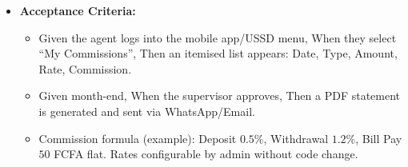 \documentclass[11pt]{article}
\begin{document}
\begin{exoresolu}
\begin{enumerate}
\begin{enumerate}
        \begin{itemize}
            \item \textbf{Acceptance Criteria:}
            \begin{itemize}
                \item Given the agent logs into the mobile app/USSD menu, When they select ``My Commissions'', Then an itemised list appears: Date, Type, Amount, Rate, Commission.
                \item Given month-end, When the supervisor approves, Then a PDF statement is generated and sent via WhatsApp/Email.
                \item Commission formula (example): Deposit $0.5\%$, Withdrawal $1.2\%$, Bill Pay $50$ FCFA flat. Rates configurable by admin without code change.
            \end{itemize}
        \end{itemize}
    \end{enumerate}
\end{enumerate}
\end{exoresolu}
\end{document}
